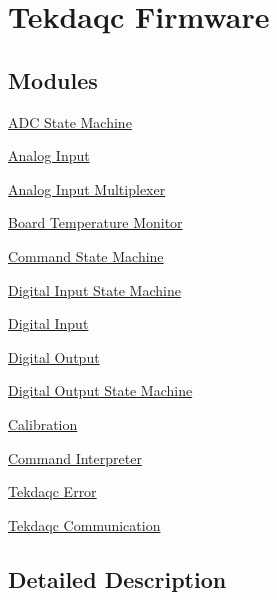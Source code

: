 \hypertarget{group__tekdaqc__firmware}{\section{Tekdaqc Firmware}
\label{group__tekdaqc__firmware}
}
\subsection*{Modules}
\begin{DoxyCompactItemize}
\item 
\hyperlink{group__adc__statemachine}{A\-D\-C State Machine}
\item 
\hyperlink{group__analog__input}{Analog Input}
\item 
\hyperlink{group__analog__input__multiplexer}{Analog Input Multiplexer}
\item 
\hyperlink{group__board__temperature}{Board Temperature Monitor}
\item 
\hyperlink{group__command__state}{Command State Machine}
\item 
\hyperlink{group__di__statemachine}{Digital Input State Machine}
\item 
\hyperlink{group__digital__input}{Digital Input}
\item 
\hyperlink{group__digital__output}{Digital Output}
\item 
\hyperlink{group__do__statemachine}{Digital Output State Machine}
\item 
\hyperlink{group__tekdaqc__calibration}{Calibration}
\item 
\hyperlink{group__command__interpreter}{Command Interpreter}
\item 
\hyperlink{group__tekdaqc__error}{Tekdaqc Error}
\item 
\hyperlink{group__tekdaqc__communication}{Tekdaqc Communication}
\end{DoxyCompactItemize}


\subsection{Detailed Description}
